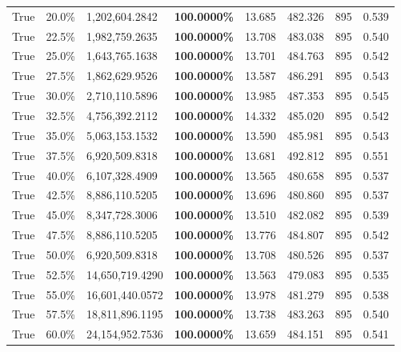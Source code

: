 \begin{table}[H]
\begin{tabular}{lllrllll}
\cline{1-8}
True & 20.0\% & 1,202,604.2842 & \bfseries \color{red} 100.0000\% & 13.685 & 482.326 & 895 & 0.539 \\
\cline{1-8}
True & 22.5\% & 1,982,759.2635 & \bfseries \color{red} 100.0000\% & 13.708 & 483.038 & 895 & 0.540 \\
\cline{1-8}
True & 25.0\% & 1,643,765.1638 & \bfseries \color{red} 100.0000\% & 13.701 & 484.763 & 895 & 0.542 \\
\cline{1-8}
True & 27.5\% & 1,862,629.9526 & \bfseries \color{red} 100.0000\% & 13.587 & 486.291 & 895 & 0.543 \\
\cline{1-8}
True & 30.0\% & 2,710,110.5896 & \bfseries \color{red} 100.0000\% & 13.985 & 487.353 & 895 & 0.545 \\
\cline{1-8}
True & 32.5\% & 4,756,392.2112 & \bfseries \color{red} 100.0000\% & 14.332 & 485.020 & 895 & 0.542 \\
\cline{1-8}
True & 35.0\% & 5,063,153.1532 & \bfseries \color{red} 100.0000\% & 13.590 & 485.981 & 895 & 0.543 \\
\cline{1-8}
True & 37.5\% & 6,920,509.8318 & \bfseries \color{red} 100.0000\% & 13.681 & 492.812 & 895 & 0.551 \\
\cline{1-8}
True & 40.0\% & 6,107,328.4909 & \bfseries \color{red} 100.0000\% & 13.565 & 480.658 & 895 & 0.537 \\
\cline{1-8}
True & 42.5\% & 8,886,110.5205 & \bfseries \color{red} 100.0000\% & 13.696 & 480.860 & 895 & 0.537 \\
\cline{1-8}
True & 45.0\% & 8,347,728.3006 & \bfseries \color{red} 100.0000\% & 13.510 & 482.082 & 895 & 0.539 \\
\cline{1-8}
True & 47.5\% & 8,886,110.5205 & \bfseries \color{red} 100.0000\% & 13.776 & 484.807 & 895 & 0.542 \\
\cline{1-8}
True & 50.0\% & 6,920,509.8318 & \bfseries \color{red} 100.0000\% & 13.708 & 480.526 & 895 & 0.537 \\
\cline{1-8}
True & 52.5\% & 14,650,719.4290 & \bfseries \color{red} 100.0000\% & 13.563 & 479.083 & 895 & 0.535 \\
\cline{1-8}
True & 55.0\% & 16,601,440.0572 & \bfseries \color{red} 100.0000\% & 13.978 & 481.279 & 895 & 0.538 \\
\cline{1-8}
True & 57.5\% & 18,811,896.1195 & \bfseries \color{red} 100.0000\% & 13.738 & 483.263 & 895 & 0.540 \\
\cline{1-8}
True & 60.0\% & 24,154,952.7536 & \bfseries \color{red} 100.0000\% & 13.659 & 484.151 & 895 & 0.541 \\

\end{tabular}
\end{table}
